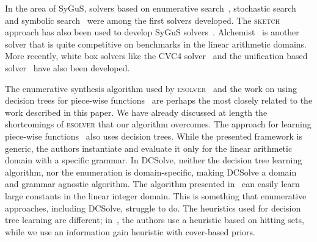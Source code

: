 \documentclass{llncs}
\newcommand{\sygus}{{\sffamily\fontsize{8.5}{10}\selectfont
    SyGuS}\xspace}
\newcommand{\dcsolve}{{\sffamily\fontsize{8.5}{10}\selectfont
    DCSolve}\xspace}
\newcommand{\esolver}{\textsc{esolver}\xspace}
\newcommand{\sketch}{\textsc{sketch}\xspace}
\newcommand{\pwsolve}{{\sffamily\fontsize{8.5}{10}\selectfont
    PWSolve}\xspace}
\begin{document}
In the area of \sygus, solvers based on enumerative
search~\cite{udupa-transit}, stochastic
search~\cite{schkufza-13,udupa-sygus} and symbolic
search~\cite{gulwani-pldi-11,jha-10} were among the first solvers
developed. The \sketch approach has also been used to develop \sygus
solvers~\cite{jeon-15}. Alchemist~\cite{saha-15} is another solver
that is quite competitive on benchmarks in the linear arithmetic
domains. More recently, white box solvers like the CVC4
solver~\cite{reynolds-15} and the unification based
solver~\cite{alur-15} have also been developed.

The enumerative synthesis algorithm used by
\esolver~\cite{udupa-transit, udupa-sygus} and the work on using decision
trees for piece-wise functions~\cite{madhusudan-16-pw} are perhaps the
most closely related to the work described in this paper.
We have already discussed at length the shortcomings of \esolver that our
algorithm overcomes.
The approach for learning piece-wise functions~\cite{madhusudan-16-pw}
also uses decision trees.
  While the presented framework is generic, the authors instantiate and
  evaluate it only for the linear arithmetic domain with a specific
  grammar.
  In \dcsolve, neither the decision tree learning algorithm, nor the
  enumeration is domain-specific, making \dcsolve a domain and grammar
  agnostic algorithm.
  The algorithm presented in~\cite{madhusudan-16-pw} can
  easily learn large constants in the linear integer domain.
  This is something that enumerative approaches, including \dcsolve,
  struggle to do.
 The heuristics used for decision tree learning are different;
  in~\cite{madhusudan-16-pw}, the authors use a heuristic based on
  hitting sets, while we use an information gain heuristic with
  cover-based priors.
\end{document}
